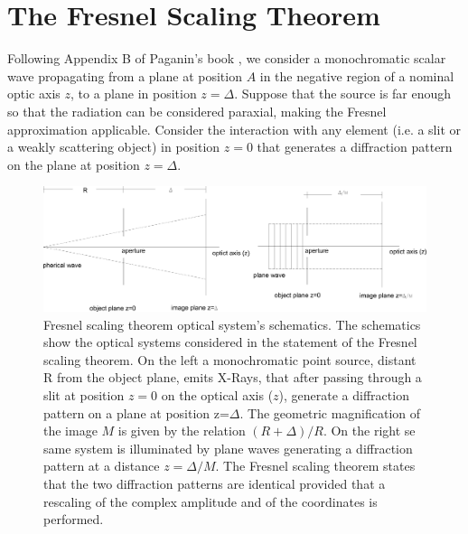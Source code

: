 \documentclass{iucr}              %
\begin{document}
\section{The Fresnel Scaling Theorem}
\label{appendix_scaling}

Following Appendix B of Paganin's book \cite{paganin_book}, we consider a monochromatic scalar wave propagating from a plane at position $A$ in the negative region of a nominal optic axis $z$, to a plane in position $z=\Delta$. Suppose that the source is far enough so that the radiation can be considered paraxial, making the Fresnel approximation applicable. Consider the interaction with any element (i.e. a slit or a weakly scattering object) in position $z=0$ that generates a diffraction pattern on the plane at position $z=\Delta$. 

\vspace{0.5 cm}
\begin{figure}
\caption{Fresnel scaling theorem optical system's schematics. The schematics show the optical systems considered in the statement of the Fresnel scaling theorem. On the left a monochromatic point source, distant R from the object plane, emits X-Rays, that after passing through a slit at position $z=0$ on the optical axis ($z$), generate a diffraction pattern on a plane at position z=$\Delta$. The geometric magnification of the image $M$ is given by the relation $(R+\Delta)/R$. On the right se same system is illuminated by plane waves generating a diffraction pattern at a distance $z=\Delta/M$. The Fresnel scaling theorem states that the two diffraction patterns are identical provided that a rescaling of the complex amplitude and of the coordinates is performed.} 
\centering
\includegraphics[width=1\textwidth]{./grafico_gio_paga.png}

\end{figure}
\end{document}
